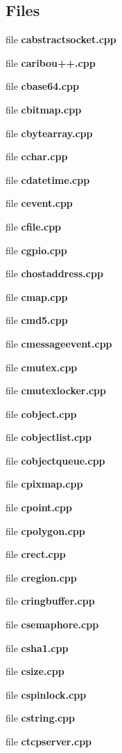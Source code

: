 \subsection*{Files}
\begin{DoxyCompactItemize}
\item 
file {\bf cabstractsocket.\-cpp}
\item 
file {\bf caribou++.\-cpp}
\item 
file {\bf cbase64.\-cpp}
\item 
file {\bf cbitmap.\-cpp}
\item 
file {\bf cbytearray.\-cpp}
\item 
file {\bf cchar.\-cpp}
\item 
file {\bf cdatetime.\-cpp}
\item 
file {\bf cevent.\-cpp}
\item 
file {\bf cfile.\-cpp}
\item 
file {\bf cgpio.\-cpp}
\item 
file {\bf chostaddress.\-cpp}
\item 
file {\bf cmap.\-cpp}
\item 
file {\bf cmd5.\-cpp}
\item 
file {\bf cmessageevent.\-cpp}
\item 
file {\bf cmutex.\-cpp}
\item 
file {\bf cmutexlocker.\-cpp}
\item 
file {\bf cobject.\-cpp}
\item 
file {\bf cobjectlist.\-cpp}
\item 
file {\bf cobjectqueue.\-cpp}
\item 
file {\bf cpixmap.\-cpp}
\item 
file {\bf cpoint.\-cpp}
\item 
file {\bf cpolygon.\-cpp}
\item 
file {\bf crect.\-cpp}
\item 
file {\bf cregion.\-cpp}
\item 
file {\bf cringbuffer.\-cpp}
\item 
file {\bf csemaphore.\-cpp}
\item 
file {\bf csha1.\-cpp}
\begin{DoxyCompactList}\small\item\em 

 \end{DoxyCompactList}\item 
file {\bf csize.\-cpp}
\item 
file {\bf cspinlock.\-cpp}
\item 
file {\bf cstring.\-cpp}
\item 
file {\bf ctcpserver.\-cpp}
\begin{DoxyCompactList}\small\item\em 


\end{DoxyCompactList}
\end{DoxyCompactItemize}

